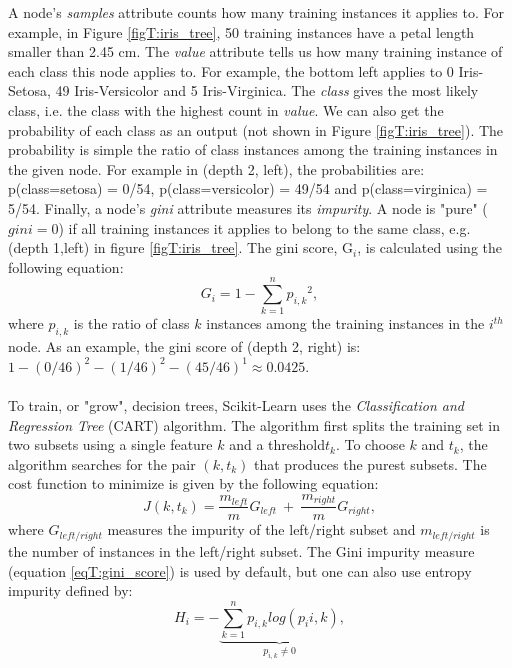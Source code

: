 \documentclass[12pt]{article}
\numberwithin{figure}{section}
\begin{document}
\noindent
A node's \textit{samples} attribute counts how many training instances it applies to. For example, in Figure \ref{figT:iris_tree}, 50 training instances have a petal length smaller than 2.45 cm. The \textit{value} attribute tells us how many training instance of each class this node applies to. For example, the bottom left applies to 0 Iris-Setosa, 49 Iris-Versicolor and 5 Iris-Virginica. The \textit{class} gives the most likely class, i.e. the class with the highest count in \textit{value}. We can also get the probability of each class as an output (not shown in Figure \ref{figT:iris_tree}). The probability is simple the ratio of class instances among the training instances in the given node. For example in (depth 2, left), the probabilities are: p(class=setosa) = 0/54, p(class=versicolor) = 49/54 and p(class=virginica) = 5/54. Finally, a node's \textit{gini} attribute measures its \textit{impurity}. A node is "pure" ($gini=0$) if all training instances it applies to belong to the same class, e.g. (depth 1,left) in figure \ref{figT:iris_tree}. The gini score, G$_i$, is calculated using the following equation:
\begin{equation}
G_i = 1 - \sum_{k=1}^{n}{p_{i,k}}^2,
\label{eqT:gini_score}
\end{equation}
where $p_{i,k}$ is the ratio of class $k$ instances among the training instances in the $i^{th}$ node. As an example, the gini score of (depth 2, right) is: $1-(0/46)^2-(1/46)^2-(45/46)^1 \approx 0.0425$. \\ \\
To train, or "grow", decision trees, Scikit-Learn uses the \textit{Classification and Regression Tree} (CART) algorithm. The algorithm first splits the training set in two subsets using a single feature $k$ and a threshold$t_k$. To choose $k$ and $t_k$, the algorithm searches for the pair $(k, t_k)$ that produces the purest subsets. The cost function to minimize is given by the following equation:
\begin{equation}
J(k,t_k) = \frac{m_{left}}{m}G_{left}\ +\ \frac{m_{right}}{m}G_{right},
\label{eqT:CART_cost}
\end{equation}
where $G_{left/right}$ measures the impurity of the left/right subset and $m_{left/right}$ is the number of instances in the left/right subset. The Gini impurity measure (equation \ref{eqT:gini_score}) is used by default, but one can also use entropy impurity defined by:
\begin{equation}
H_i = - \underbrace{\sum_{k=1}^{n} p_{i,k}log(p_i{i,k})}_{p_{i,k}\neq0},
\label{eqT:entropy_cost}
\end{equation}
\end{document}
